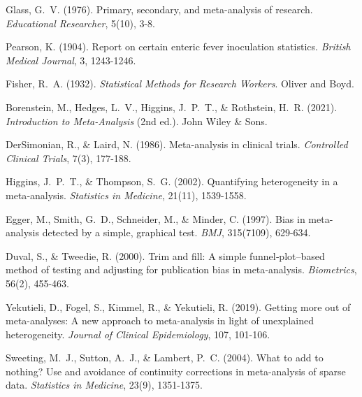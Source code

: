 \documentclass[12pt,a4paper]{report}
\begin{document}
\begin{thebibliography}{99}

Glass, G.~V. (1976).
\newblock Primary, secondary, and meta-analysis of research.
\newblock \textit{Educational Researcher}, 5(10), 3-8.

Pearson, K. (1904).
\newblock Report on certain enteric fever inoculation statistics.
\newblock \textit{British Medical Journal}, 3, 1243-1246.

Fisher, R.~A. (1932).
\newblock \textit{Statistical Methods for Research Workers}.
\newblock Oliver and Boyd.

Borenstein, M., Hedges, L.~V., Higgins, J.~P.~T., \& Rothstein, H.~R. (2021).
\newblock \textit{Introduction to Meta-Analysis} (2nd ed.).
\newblock John Wiley \& Sons.

DerSimonian, R., \& Laird, N. (1986).
\newblock Meta-analysis in clinical trials.
\newblock \textit{Controlled Clinical Trials}, 7(3), 177-188.

Higgins, J.~P.~T., \& Thompson, S.~G. (2002).
\newblock Quantifying heterogeneity in a meta‐analysis.
\newblock \textit{Statistics in Medicine}, 21(11), 1539-1558.

Egger, M., Smith, G.~D., Schneider, M., \& Minder, C. (1997).
\newblock Bias in meta-analysis detected by a simple, graphical test.
\newblock \textit{BMJ}, 315(7109), 629-634.

Duval, S., \& Tweedie, R. (2000).
\newblock Trim and fill: A simple funnel‐plot–based method of testing and adjusting for publication bias in meta‐analysis.
\newblock \textit{Biometrics}, 56(2), 455-463.

Yekutieli, D., Fogel, S., Kimmel, R., \& Yekutieli, R. (2019).
\newblock Getting more out of meta-analyses: A new approach to meta-analysis in light of unexplained heterogeneity.
\newblock \textit{Journal of Clinical Epidemiology}, 107, 101-106.

Sweeting, M.~J., Sutton, A.~J., \& Lambert, P.~C. (2004).
\newblock What to add to nothing? Use and avoidance of continuity corrections in meta-analysis of sparse data.
\newblock \textit{Statistics in Medicine}, 23(9), 1351-1375.


\end{thebibliography}
\end{document}
